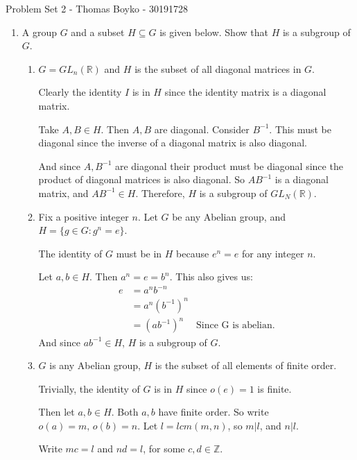 \documentclass{article}
\begin{document}
    \huge Problem Set 2 - Thomas Boyko - 30191728
    \normalsize
\begin{enumerate} 

    \item A group $G$ and a subset $H \subseteq  G$ is given below. Show that $H$ is a subgroup of $G$.
    \begin{enumerate}[label= (\alph*)] 
        \item $G = GL_n(\mathbb{R})$ and $H$ is the subset of all diagonal matrices
            in $G$.

            Clearly the identity $I$ is in $H$ since the identity matrix is
            a diagonal matrix.

            Take $A,B\in H$. Then $A,B$ are diagonal. Consider $B^{-1}$.
            This must be diagonal since the inverse of a diagonal matrix is 
            also diagonal.

            And since $A,B^{-1}$ are diagonal their product must be diagonal since 
            the product of diagonal matrices is also diagonal.
            So $AB^{-1}$ is a diagonal matrix, and $AB^{-1}\in H$. Therefore, $H
            $ is a subgroup of $GL_N(\mathbb{R}).$

        \item Fix a positive integer $n$. Let $G$ be any Abelian group, and 
            $H = \{ g \in G : g^n = e\}$.

            The identity of $G$ must be in $H$ because $e^{n}=e$ for any integer $n$.

            Let $a,b\in H$. Then $a^{n}=e=b^{n}$. This also gives us:
            \begin{align*}
                e&= a^{n}b^{-n}\\
                &= a^{n}(b^{-1})^{n} \\
                &= (ab^{-1})^{n} &\text{Since G is abelian}
            .\end{align*}
            And since $ab^{-1}\in H$, $H$ is a subgroup of $G$.

        \item $G$ is any Abelian group, $H$ is the subset of all elements of
            finite order.

            Trivially, the identity of $G$ is in $H$ since $o(e)=1$ is finite.

            Then let $a,b\in H$. Both $a,b$ have finite order. So write 
            $o(a)=m, \,o(b)=n$. Let $l=lcm(m,n)$, so $m|l$, and $n|l$.

            Write $mc=l$ and $nd=l$, for some $c,d\in \mathbb{Z}$.


\end{enumerate}
\end{enumerate}
\end{document}
